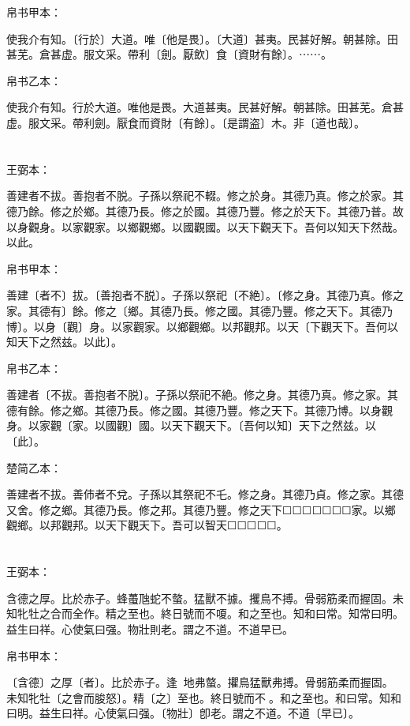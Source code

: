 \documentclass[a5paper]{ctexbook}
\begin{document}
    
    帛书甲本：

    使我介有知。〔行於〕大道。唯〔他是畏〕。〔大道〕甚夷。民甚好解。朝甚除。田甚芜。倉甚虚。服文采。帶利〔劍。厭飲〕食〔資財有餘〕。⋯⋯。

    帛书乙本：

    使我介有知。行於大道。唯他是畏。大道甚夷。民甚好解。朝甚除。田甚芜。倉甚虚。服文采。帶利劍。厭食而資財〔有餘〕。〔是謂盗〕木。非〔道也哉〕。

    \chapter{}
    王弼本：

    善建者不拔。善抱者不脱。子孫以祭祀不輟。修之於身。其德乃真。修之於家。其德乃餘。修之於鄉。其德乃長。修之於國。其德乃豐。修之於天下。其德乃普。故以身觀身。以家觀家。以鄉觀鄉。以國觀國。以天下觀天下。吾何以知天下然哉。以此。

    
    帛书甲本：

    善建〔者不〕拔。〔善抱者不脱〕。子孫以祭祀〔不絶〕。〔修之身。其德乃真。修之家。其德有〕餘。修之〔鄉。其德乃長。修之國。其德乃豐。修之天下。其德乃博〕。以身〔觀〕身。以家觀家。以鄉觀鄉。以邦觀邦。以天〔下觀天下。吾何以知天下之然兹。以此〕。

    帛书乙本：

    善建者〔不拔。善抱者不脱〕。子孫以祭祀不絶。修之身。其德乃真。修之家。其德有餘。修之鄉。其德乃長。修之國。其德乃豐。修之天下。其德乃博。以身觀身。以家觀〔家。以國觀〕國。以天下觀天下。〔吾何以知〕天下之然兹。以〔此〕。

    楚简乙本：

    善建者不拔。善伂者不兌。子孫以其祭祀不乇。修之身。其德乃貞。修之家。其德又舍。修之鄉。其德乃長。修之邦。其德乃豐。修之天下☐☐☐☐☐☐☐家。以鄉觀鄉。以邦觀邦。以天下觀天下。吾可以智天☐☐☐☐☐。

    \chapter{}
    王弼本：

    含德之厚。比於赤子。蜂蠆虺蛇不螫。猛獸不據。攫鳥不搏。骨弱筋柔而握固。未知牝牡之合而全作。精之至也。終日號而不嗄。和之至也。知和曰常。知常曰明。益生曰祥。心使氣曰强。物壯則老。謂之不道。不道早已。

    
    帛书甲本：

    〔含德〕之厚〔者〕。比於赤子。逢𢔯𧍥地弗螫。㩴鳥猛獸弗搏。骨弱筋柔而握固。未知牝牡〔之會而朘怒〕。精〔之〕至也。終日號而不𢖻。和之至也。和曰常。知和曰明。益生曰祥。心使氣曰强。〔物壯〕卽老。謂之不道。不道〔早已〕。
\end{document}
